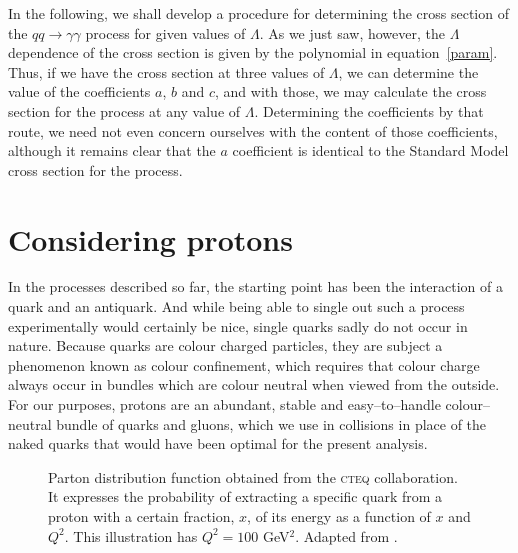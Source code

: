 \begin{edits}
In the following, we shall develop a procedure for determining the cross section of the $qq\rightarrow\gamma\gamma$ process for given values of $\Lambda$. As we just saw, however, the $\Lambda$ dependence of the cross section is given by the polynomial in equation~\eqref{param}. Thus, if we have the cross section at three values of $\Lambda$, we can determine the value of the coefficients $a$, $b$ and $c$, and with those, we may calculate the cross section for the process at any value of $\Lambda$. Determining the coefficients by that route, we need not even concern ourselves with the content of those coefficients, although it remains clear that the $a$ coefficient is identical to the Standard Model cross section for the process.

\end{edits}
\section{Considering protons \label{sec.pdfth}}
In the processes described so far, the starting point has been the interaction of a quark and an antiquark. And while being able to single out such a process experimentally would certainly be nice, single quarks sadly do not occur in nature. Because quarks are colour charged particles, they are subject a phenomenon known as colour confinement, which requires that colour charge always occur in bundles which are colour neutral when viewed from the outside. For our purposes, protons are an abundant, stable and easy--to--handle colour--neutral bundle of quarks and gluons, which we use in collisions in place of the naked quarks that would have been optimal for the present analysis.

\begin{figure}[htp]
\begin{minipage}[b]{.69\textwidth}
\begin{infilsf} 
\tiny 

\end{infilsf}
\end{minipage}
\hfill\begin{minipage}[b]{.3\textwidth}
\caption{Parton distribution function obtained from the \textsc{cteq} collaboration. It expresses the probability of extracting a specific quark from a proton with a certain fraction, $x$, of its energy as a function of $x$ and $Q^2$. This illustration has $Q^2 = 100$ GeV$^2$. Adapted from \cite{durpdf}.\label{pdff}}
\end{minipage}
\end{figure}

